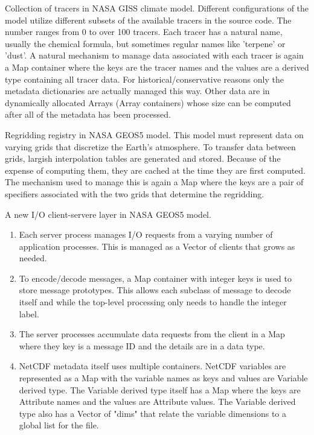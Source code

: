 \documentclass{article}
\begin{document}
Collection of tracers in NASA GISS climate model.  Different   configurations of the model utilize different subsets of the   available tracers in the source code.  The number ranges from 0 to   over 100 tracers.  Each tracer has a natural name, usually the   chemical formula, but sometimes regular names like 'terpene' or   'dust'.  A natural mechanism to manage data associated with each
   tracer is again a Map container where the keys are the tracer names   and the values are a derived type containing all tracer data.  For   historical/conservative reasons only the metadata dictionaries are   actually managed this way.  Other data are in dynamically allocated
   Arrays (Array containers) whose size can be computed after all of   the metadata has been processed.

Regridding registry in NASA GEOS5 model.  This model must represent   data on varying grids that discretize the Earth's atmosphere.  To   transfer data between grids, largish interpolation tables are
   generated and stored.  Because of the expense of computing them,   they are cached at the time they are first computed.  The mechanism   used to manage this is again a Map where the keys are a pair of
   specifiers associated with the two grids that determine the   regridding.


A new I/O client-servere layer in NASA GEOS5 model.   

\begin{enumerate}
\item Each server process manages I/O requests from a varying      number of application processes.  This is managed as a Vector of      clients that grows as needed.

\item To encode/decode messages, a Map container with integer keys is       used to store message prototypes.  This allows each subclass of       message to decode itself and while the top-level processing       only needs to handle the integer label.

\item The server processes accumulate data requests from the client        in a Map where they key is a message ID and the details are in        a data type.

\item NetCDF metadata itself uses multiple containers.  NetCDF       variables are represented as a Map with the variable names as       keys and values are Variable derived type.  The Variable
       derived type itself has a Map where the keys are Attribute       names and the values are Attribute values.  The Variable       derived type also has a Vector of "dims" that relate the
       variable dimensions to a global list for the file.
\end{enumerate}
\end{document}
